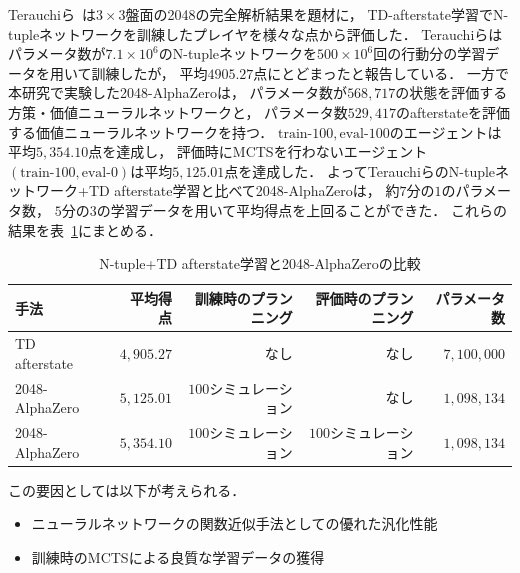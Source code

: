 Terauchiら~\cite{Min2048_matsuzaki}は$3\times3$盤面の2048の完全解析結果を題材に， TD-afterstate学習でN-tupleネットワークを訓練したプレイヤを様々な点から評価した．
Terauchiらはパラメータ数が$7.1\times{10}^6$のN-tupleネットワークを$500 \times {10}^6$回の行動分の学習データを用いて訓練したが， 平均$4905.27$点にとどまったと報告している．
一方で本研究で実験した2048-AlphaZeroは， パラメータ数が$568,717$の状態を評価する方策・価値ニューラルネットワークと， パラメータ数$529,417$のafterstateを評価する価値ニューラルネットワークを持つ．
$\text{train-}100,\text{eval-}100$のエージェントは平均$5,354.10$点を達成し， 評価時にMCTSを行わないエージェント$(\text{train-}100,\text{eval-}0)$は平均$5,125.01$点を達成した．
よってTerauchiらのN-tupleネットワーク+TD afterstate学習と比べて2048-AlphaZeroは， 約$7$分の$1$のパラメータ数， $5$分の$3$の学習データを用いて平均得点を上回ることができた．
これらの結果を表~\ref{table:terauchi}にまとめる．
\begin{table}[t]
    \centering
    \begin{tabular}{lrrrr}
        \hline \hline
        手法 & 平均得点 & 訓練時のプランニング & 評価時のプランニング & パラメータ数\\ \hline
        TD afterstate~\cite{Min2048_matsuzaki} & $4,905.27$ & なし & なし & $7,100,000$\\
        2048-AlphaZero & $5,125.01$ & $100$シミュレーション & なし & $1,098,134$\\
        2048-AlphaZero & $5,354.10$ & $100$シミュレーション & $100$シミュレーション & $1,098,134$ \\
        \hline
    \end{tabular}
    \caption{N-tuple+TD afterstate学習と2048-AlphaZeroの比較}
    \label{table:terauchi}
\end{table}

この要因としては以下が考えられる．
\begin{itemize}
    \item ニューラルネットワークの関数近似手法としての優れた汎化性能
    \item 訓練時のMCTSによる良質な学習データの獲得
\end{itemize}

